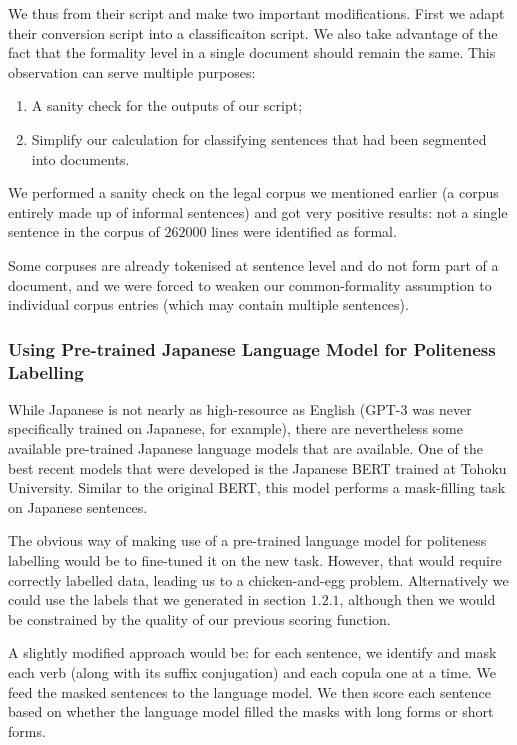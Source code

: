\documentclass[11pt]{article}
\begin{document}
We thus from their script and make two important modifications. First we adapt their conversion script into a classificaiton script.
We also take advantage of the fact that the formality level in a single document should remain the same. This observation can serve multiple purposes:

\begin{enumerate}[label=\arabic*]
    \item A sanity check for the outputs of our script;
    \item Simplify our calculation for classifying sentences that had been segmented into documents.
\end{enumerate}

We performed a sanity check on the legal corpus we mentioned earlier (a corpus entirely made up of informal sentences) and got very positive results: not a single sentence in the corpus of $262000$ lines were identified as formal.

Some corpuses are already tokenised at sentence level and do not form part of a document, and we were forced to weaken our common-formality assumption to individual corpus entries (which may contain multiple sentences). 

\subsubsection{Using Pre-trained Japanese Language Model for Politeness Labelling}

While Japanese is not nearly as high-resource as English (GPT-3 was never specifically trained on Japanese, for example), there are nevertheless some available pre-trained Japanese language models that are available. One of the best recent models that were developed is the Japanese BERT trained at Tohoku University. Similar to the original BERT, this model performs a mask-filling task on Japanese sentences. 

The obvious way of making use of a pre-trained language model for politeness labelling would be to fine-tuned it on the new task. However, that would require correctly labelled data, leading us to a chicken-and-egg problem. Alternatively we could use the labels that we generated in section $1.2.1$, although then we would be constrained by the quality of our previous scoring function.

A slightly modified approach would be: for each sentence, we identify and mask each verb (along with its suffix conjugation) and each copula one at a time. We feed the masked sentences to the language model. We then score each sentence based on whether the language model filled the masks with long forms or short forms.
\end{document}
